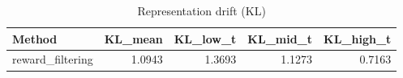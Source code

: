 \begin{table}[htbp]
\centering
\caption{Representation drift (KL)}
\label{tab:repr-drift}
\begin{tabular}{lrrrr}
\toprule
\textbf{Method} & \textbf{KL\_mean} & \textbf{KL\_low\_t} & \textbf{KL\_mid\_t} & \textbf{KL\_high\_t} \\
\midrule
reward\_filtering & 1.0943 & 1.3693 & 1.1273 & 0.7163 \\
\bottomrule
\end{tabular}
\end{table}